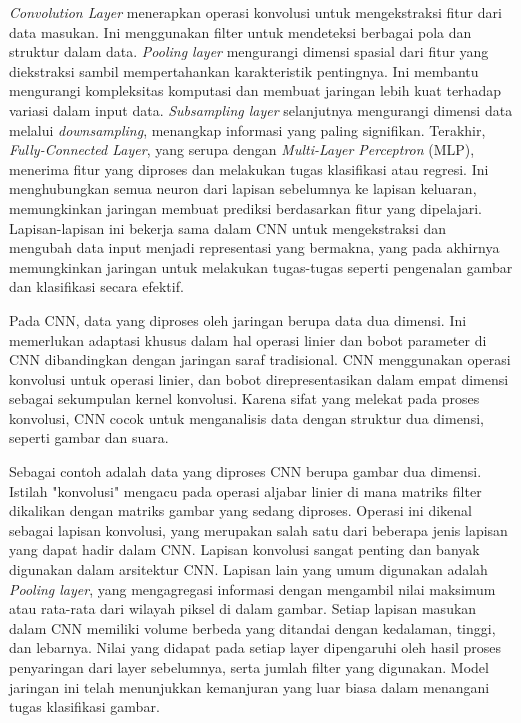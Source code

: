 \emph{Convolution Layer} menerapkan operasi konvolusi untuk mengekstraksi fitur dari data masukan. Ini menggunakan filter untuk mendeteksi berbagai pola dan struktur dalam data. \emph{Pooling layer} mengurangi dimensi spasial dari fitur yang diekstraksi sambil mempertahankan karakteristik pentingnya. Ini membantu mengurangi kompleksitas komputasi dan membuat jaringan lebih kuat terhadap variasi dalam input data. \emph{Subsampling layer} selanjutnya mengurangi dimensi data melalui \emph{downsampling}, menangkap informasi yang paling signifikan. Terakhir, \emph{Fully-Connected Layer}, yang serupa dengan \emph{Multi-Layer Perceptron} (MLP), menerima fitur yang diproses dan melakukan tugas klasifikasi atau regresi. Ini menghubungkan semua neuron dari lapisan sebelumnya ke lapisan keluaran, memungkinkan jaringan membuat prediksi berdasarkan fitur yang dipelajari. Lapisan-lapisan ini bekerja sama dalam CNN untuk mengekstraksi dan mengubah data input menjadi representasi yang bermakna, yang pada akhirnya memungkinkan jaringan untuk melakukan tugas-tugas seperti pengenalan gambar dan klasifikasi secara efektif.

Pada CNN, data yang diproses oleh jaringan berupa data dua dimensi. Ini memerlukan adaptasi khusus dalam hal operasi linier dan bobot parameter di CNN dibandingkan dengan jaringan saraf tradisional. CNN menggunakan operasi konvolusi untuk operasi linier, dan bobot direpresentasikan dalam empat dimensi sebagai sekumpulan kernel konvolusi. Karena sifat yang melekat pada proses konvolusi, CNN cocok untuk menganalisis data dengan struktur dua dimensi, seperti gambar dan suara.

Sebagai contoh adalah data yang diproses CNN berupa gambar dua dimensi. Istilah "konvolusi" mengacu pada operasi aljabar linier di mana matriks filter dikalikan dengan matriks gambar yang sedang diproses. Operasi ini dikenal sebagai lapisan konvolusi, yang merupakan salah satu dari beberapa jenis lapisan yang dapat hadir dalam CNN. Lapisan konvolusi sangat penting dan banyak digunakan dalam arsitektur CNN. Lapisan lain yang umum digunakan adalah \emph{Pooling layer}, yang mengagregasi informasi dengan mengambil nilai maksimum atau rata-rata dari wilayah piksel di dalam gambar. Setiap lapisan masukan dalam CNN memiliki volume berbeda yang ditandai dengan kedalaman, tinggi, dan lebarnya. Nilai yang didapat pada setiap layer dipengaruhi oleh hasil proses penyaringan dari layer sebelumnya, serta jumlah filter yang digunakan. Model jaringan ini telah menunjukkan kemanjuran yang luar biasa dalam menangani tugas klasifikasi gambar.

